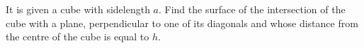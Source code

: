It is given a cube with sidelength $a$. Find the surface of the intersection of the cube with a plane, perpendicular to one of its diagonals and whose distance from the centre of the cube is equal to $h$.